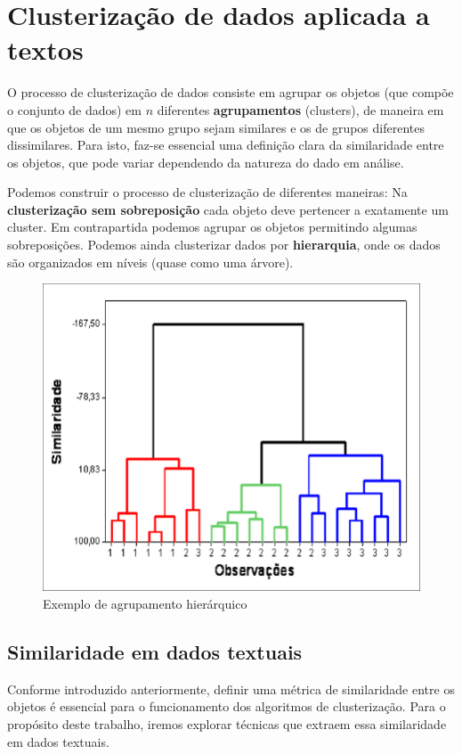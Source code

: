  \chapter{Clusterização de dados aplicada a textos}\label{cap:clus}
 
 O processo de clusterização de dados consiste em agrupar os objetos (que compõe o conjunto de dados) em $n$ diferentes \textbf{agrupamentos} (clusters), de maneira em que os objetos de um mesmo grupo sejam similares e os de grupos diferentes dissimilares.
 Para isto, faz-se essencial uma definição clara da similaridade entre os objetos, que pode variar dependendo da natureza do dado em análise.
 
 Podemos construir o processo de clusterização de diferentes maneiras: Na \textbf{clusterização sem sobreposição} cada objeto deve pertencer a exatamente um cluster. 
 Em contrapartida podemos agrupar os objetos permitindo algumas sobreposições. 
 Podemos ainda clusterizar dados por \textbf{hierarquia}, onde os dados são organizados em níveis (quase como uma árvore).
 
 \begin{figure}[H]
   \centering
   \includegraphics[scale=0.50]{figs/cluster_h.png}
    \caption{Exemplo de agrupamento hierárquico}
    \label{fig:clusterh}
 \end{figure}
 
 \pagebreak
 
 \section{Similaridade em dados textuais}
 Conforme introduzido anteriormente, definir uma métrica de similaridade entre os objetos é essencial para o funcionamento dos algoritmos de clusterização.
 Para o propósito deste trabalho, iremos explorar técnicas que extraem essa similaridade em dados textuais.
 
